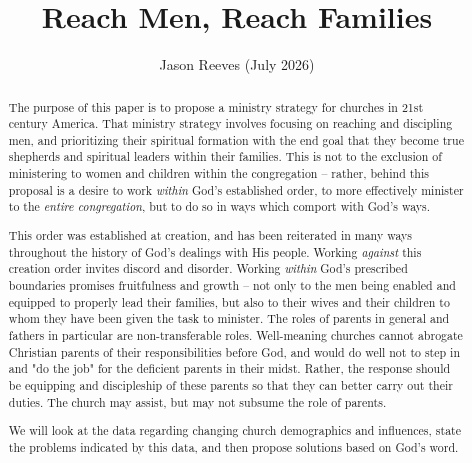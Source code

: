 \documentclass[justified, nobib]{tufte-handout}
\title{Reach Men, Reach Families}
\author{Jason Reeves (July 2026)}
\date{}
\begin{document}
\ifdefined\embedversion
  \pagestyle{empty}
\fi

\maketitle
{}

\begin{abstract}
The purpose of this paper is to propose a ministry strategy for churches in 21st century America.  That ministry strategy involves focusing on reaching and discipling men, and prioritizing their spiritual formation with the end goal that they become true shepherds and spiritual leaders within their families.  This is not to the exclusion of ministering to women and children within the congregation -- rather, behind this proposal is a desire to work \textit{within} God's established order, to more effectively minister to the \textit{entire congregation}, but to do so in ways which comport with God's ways. 

This order was established at creation, and has been reiterated in many ways throughout the history of God's dealings with His people.  Working \textit{against} this creation order invites discord and disorder.  Working \textit{within} God's prescribed boundaries promises fruitfulness and growth -- not only to the men being enabled and equipped to properly lead their families, but also to their wives and their children to whom they have been given the task to minister.  The roles of parents in general and fathers in particular are non-transferable roles.  Well-meaning churches cannot abrogate Christian parents of their responsibilities before God, and would do well not to step in and "do the job" for the deficient parents in their midst.  Rather, the response should be equipping and discipleship of these parents so that they can better carry out their duties.  The church may assist, but may not subsume the role of parents.

We will look at the data regarding changing church demographics and influences, state the problems indicated by this data, and then propose solutions based on God's word.
\end{abstract}
\end{document}
